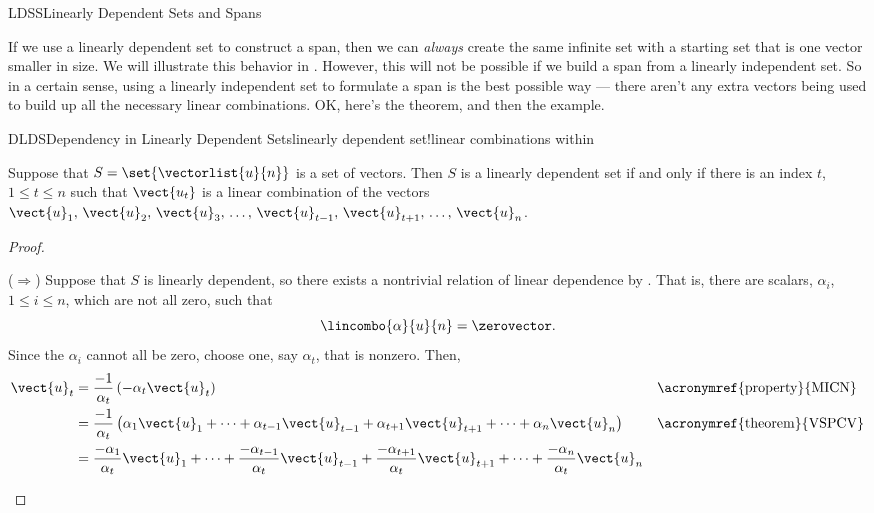 \begin{subsect}{LDSS}{Linearly Dependent Sets and Spans}
%
\begin{para}If we use a linearly dependent set to construct a span, then we can {\em always} create the same infinite set with a starting set that is one vector smaller in size.  We will illustrate this behavior in .  However, this will not be possible if we build a span from a linearly independent set.  So in a certain sense, using a linearly independent set to formulate a span is the best possible way --- there aren't any extra vectors being used to build up all the necessary linear combinations.  OK, here's the theorem, and then the example.\end{para}
%
\begin{theorem}{DLDS}{Dependency in Linearly Dependent Sets}{linearly dependent set!linear combinations within}
\begin{para}Suppose that $S=\set{\vectorlist{u}{n}}$ is a set of vectors.  Then $S$ is a linearly dependent set if and only if there is an index $t$, $1\leq t\leq n$ such that $\vect{u_t}$ is a linear combination of the vectors $\vect{u}_1,\,\vect{u}_2,\,\vect{u}_3,\,\ldots,\,\vect{u}_{t-1},\,\vect{u}_{t+1},\,\ldots,\,\vect{u}_n$.\end{para}
\end{theorem}
%
\begin{proof}
\begin{para}($\Rightarrow$) Suppose that $S$ is linearly dependent, so there exists a nontrivial relation of linear dependence by .  That is, there are scalars, $\alpha_i$, $1\leq i\leq n$, which are not all zero, such that
%
\begin{equation*}
\lincombo{\alpha}{u}{n}=\zerovector.
\end{equation*}
%
Since the $\alpha_i$ cannot all be zero, choose one, say $\alpha_t$, that is nonzero.  Then,
%
\begin{align*}
\vect{u}_t
&=\frac{-1}{\alpha_t}\left(-\alpha_t\vect{u}_t\right)&&\text{\acronymref{property}{MICN}}\\
%
&=
\frac{-1}{\alpha_t}\left(
\alpha_1\vect{u}_1+
\cdots+
\alpha_{t-1}\vect{u}_{t-1}+
\alpha_{t+1}\vect{u}_{t+1}+
\cdots+
\alpha_n\vect{u}_n
\right)&&\text{\acronymref{theorem}{VSPCV}}\\
%
&=
\frac{-\alpha_1}{\alpha_t}\vect{u}_1+
\cdots+
\frac{-\alpha_{t-1}}{\alpha_t}\vect{u}_{t-1}+
\frac{-\alpha_{t+1}}{\alpha_t}\vect{u}_{t+1}+
\cdots+
\frac{-\alpha_n}{\alpha_t}\vect{u}_n

\end{align*}
\end{para}
\end{proof}
\end{subsect}

